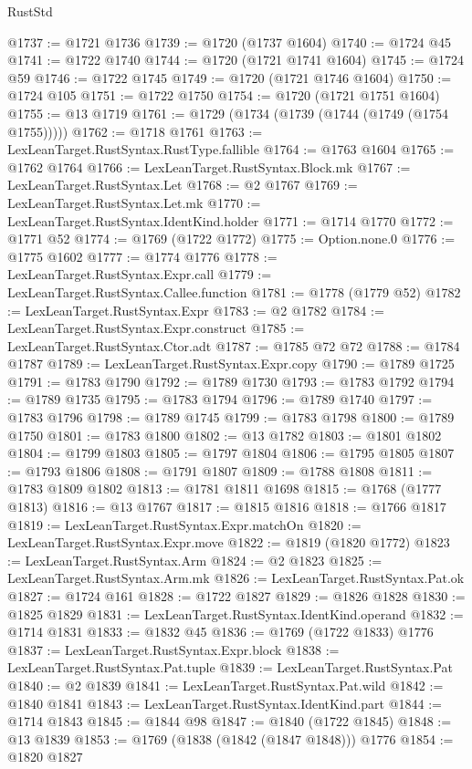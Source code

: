 \begin{lexlean}{RustStd}
\begin{coremodule}
{\begin{coremodule}
{{{{{{{{{{{{{{{{{{{{{{{{{{{{{{{{{{{{{{{{{{{{{{{@1737 := @1721 @1736
@1739 := @1720 (@1737 @1604)
@1740 := @1724 @45
@1741 := @1722 @1740
@1744 := @1720 (@1721 @1741 @1604)
@1745 := @1724 @59
@1746 := @1722 @1745
@1749 := @1720 (@1721 @1746 @1604)
@1750 := @1724 @105
@1751 := @1722 @1750
@1754 := @1720 (@1721 @1751 @1604)
@1755 := @13 @1719
@1761 := @1729 (@1734 (@1739 (@1744 (@1749 (@1754 @1755)))))
@1762 := @1718 @1761
@1763 := LexLeanTarget.RustSyntax.RustType.fallible
@1764 := @1763 @1604
@1765 := @1762 @1764
@1766 := LexLeanTarget.RustSyntax.Block.mk
@1767 := LexLeanTarget.RustSyntax.Let
@1768 := @2 @1767
@1769 := LexLeanTarget.RustSyntax.Let.mk
@1770 := LexLeanTarget.RustSyntax.IdentKind.holder
@1771 := @1714 @1770
@1772 := @1771 @52
@1774 := @1769 (@1722 @1772)
@1775 := Option.none.{0}
@1776 := @1775 @1602
@1777 := @1774 @1776
@1778 := LexLeanTarget.RustSyntax.Expr.call
@1779 := LexLeanTarget.RustSyntax.Callee.function
@1781 := @1778 (@1779 @52)
@1782 := LexLeanTarget.RustSyntax.Expr
@1783 := @2 @1782
@1784 := LexLeanTarget.RustSyntax.Expr.construct
@1785 := LexLeanTarget.RustSyntax.Ctor.adt
@1787 := @1785 @72 @72
@1788 := @1784 @1787
@1789 := LexLeanTarget.RustSyntax.Expr.copy
@1790 := @1789 @1725
@1791 := @1783 @1790
@1792 := @1789 @1730
@1793 := @1783 @1792
@1794 := @1789 @1735
@1795 := @1783 @1794
@1796 := @1789 @1740
@1797 := @1783 @1796
@1798 := @1789 @1745
@1799 := @1783 @1798
@1800 := @1789 @1750
@1801 := @1783 @1800
@1802 := @13 @1782
@1803 := @1801 @1802
@1804 := @1799 @1803
@1805 := @1797 @1804
@1806 := @1795 @1805
@1807 := @1793 @1806
@1808 := @1791 @1807
@1809 := @1788 @1808
@1811 := @1783 @1809 @1802
@1813 := @1781 @1811 @1698
@1815 := @1768 (@1777 @1813)
@1816 := @13 @1767
@1817 := @1815 @1816
@1818 := @1766 @1817
@1819 := LexLeanTarget.RustSyntax.Expr.matchOn
@1820 := LexLeanTarget.RustSyntax.Expr.move
@1822 := @1819 (@1820 @1772)
@1823 := LexLeanTarget.RustSyntax.Arm
@1824 := @2 @1823
@1825 := LexLeanTarget.RustSyntax.Arm.mk
@1826 := LexLeanTarget.RustSyntax.Pat.ok
@1827 := @1724 @161
@1828 := @1722 @1827
@1829 := @1826 @1828
@1830 := @1825 @1829
@1831 := LexLeanTarget.RustSyntax.IdentKind.operand
@1832 := @1714 @1831
@1833 := @1832 @45
@1836 := @1769 (@1722 @1833) @1776
@1837 := LexLeanTarget.RustSyntax.Expr.block
@1838 := LexLeanTarget.RustSyntax.Pat.tuple
@1839 := LexLeanTarget.RustSyntax.Pat
@1840 := @2 @1839
@1841 := LexLeanTarget.RustSyntax.Pat.wild
@1842 := @1840 @1841
@1843 := LexLeanTarget.RustSyntax.IdentKind.part
@1844 := @1714 @1843
@1845 := @1844 @98
@1847 := @1840 (@1722 @1845)
@1848 := @13 @1839
@1853 := @1769 (@1838 (@1842 (@1847 @1848))) @1776
@1854 := @1820 @1827
}}}}}}}}}}}}}}}}}}}}}}}}}}}}}}}}}}}}}}}}}}}}}}}
\end{coremodule}}
\end{coremodule}
\end{lexlean}
